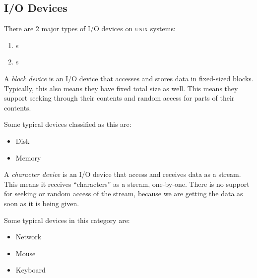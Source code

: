 \subsection{I/O Devices}\label{subsec:IO_Devices}
There are 2 major types of I/O devices on \textsc{unix} systems:
\begin{enumerate}[noitemsep]
\item {}s
\item {}s
\end{enumerate}

\begin{definition}\label{def:Block_Device}
  A \emph{block device} is an I/O device that accesses and stores data in fixed-sized blocks.
  Typically, this also means they have fixed total size as well.
  This means they support seeking through their contents and random access for parts of their contents.

  Some typical devices classified as this are:
  \begin{itemize}[noitemsep]
  \item Disk
  \item Memory
  \end{itemize}
\end{definition}

\begin{definition}\label{def:Character_Device}
  A \emph{character device} is an I/O device that access and receives data as a stream.
  This means it receives ``characters'' as a stream, one-by-one.
  There is no support for seeking or random access of the stream, because we are getting the data as soon as it is being given.

  Some typical devices in this category are:
  \begin{itemize}[noitemsep]
  \item Network
  \item Mouse
  \item Keyboard
  \end{itemize}
\end{definition}

